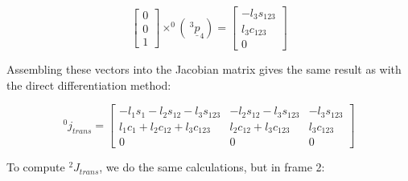 \documentclass[]{article}
\begin{document}
\begin{displaymath}
	\left[\begin{array}{c} 0 \\ 0 \\ 1 \end{array}\right] \times ^{0}(\ \!^{3}\underline{p}_{4}) = \left[ \begin{array}{c} -l_{3}s_{123} \\ l_{3}c_{123} \\ 0 \end{array}\right]
\end{displaymath}

Assembling these vectors into the Jacobian matrix gives the same result as with the direct differentiation method:

\begin{displaymath}
^{0}j_{trans} = \left[\begin{array}{ccc} -l_{1}s_{1}-l_{2}s_{12}-l_{3}s_{123} & -l_{2}s_{12}-l_{3}s_{123} & -l_{3}s_{123} \\ l_{1}c_{1} +l_{2}c_{12} +l_{3}c_{123} & l_{2}c_{12} + l_{3}c_{123} & l_{3}c_{123} \\ 0 & 0 & 0 \end{array}\right]
\end{displaymath}

To compute $^{2}J_{trans}$, we do the same calculations, but in frame 2:
\end{document}

